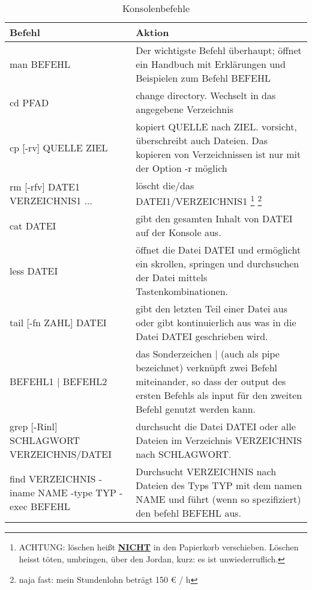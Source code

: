 \begin{table}[htb]
  \centering
  \begin{tabular}{m{3cm}m{9cm}} 
  \toprule
    	Befehl & Aktion \\
  \midrule
  
    	man BEFEHL & Der wichtigste Befehl überhaupt; öffnet ein Handbuch mit Erklärungen und Beispielen zum Befehl BEFEHL \\
    	
    	cd PFAD & change directory. Wechselt in das angegebene Verzeichnis \\
    	
    	cp [-rv] QUELLE ZIEL & kopiert QUELLE nach ZIEL. vorsicht, überschreibt auch Dateien. Das kopieren von Verzeichnissen ist nur mit der Option -r möglich \\
    	
    	rm [-rfv] DATE1 VERZEICHNIS1 ... & löscht die/das DATEI1/VERZEICHNIS1 \footnote{ACHTUNG: löschen heißt \underline{\textbf{NICHT}} in den Papierkorb verschieben. Löschen heisst töten, umbringen, über den Jordan, kurz: es ist unwiederruflich.} \footnote{naja fast: mein Stundenlohn beträgt 150 € / h} \\
    	
    	cat DATEI & gibt den gesamten Inhalt von DATEI auf der Konsole aus. \\
    	
    	less DATEI & öffnet die Datei DATEI und ermöglicht ein skrollen, springen und durchsuchen der Datei mittels Tastenkombinationen. \\
    	
    	tail [-fn ZAHL] DATEI & gibt den letzten Teil einer Datei aus oder gibt kontinuierlich aus was in die Datei DATEI geschrieben wird. \\
    	
    	BEFEHL1 | BEFEHL2 & das Sonderzeichen | (auch als pipe bezeichnet) verknüpft zwei Befehl miteinander, so dass der output des ersten Befehls als input für den zweiten Befehl genutzt werden kann. \\
    	
    	grep [-Rinl] SCHLAGWORT VERZEICHNIS/DATEI & durchsucht die Datei DATEI oder alle Dateien im Verzeichnis VERZEICHNIS nach SCHLAGWORT. \\ 
    	
    	find VERZEICHNIS -iname NAME -type TYP -exec BEFEHL & Durchsucht VERZEICHNIS nach Dateien des Typs TYP mit dem namen NAME und führt (wenn so spezifiziert) den befehl BEFEHL aus. \\
		
  \bottomrule
  
     
  \end{tabular}
  \caption[Konsolenbefehle]{Konsolenbefehle}
  \label{tab:befehle} 
\end{table}

\newpage